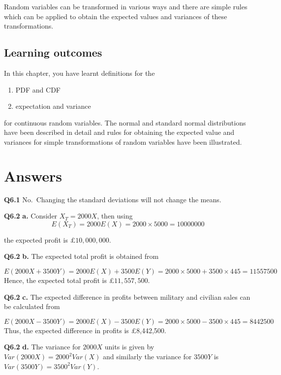 \documentclass[
  oneside]{krantz}
\begin{document}
Random variables can be transformed in various ways and there are simple rules which can be applied to obtain the expected values and variances of these transformations.

\hypertarget{learning-outcomes-3}{%
\subsection{Learning outcomes}\label{learning-outcomes-3}}

In this chapter, you have learnt definitions for the

\begin{enumerate}
\def\labelenumi{\arabic{enumi}.}
\item
  PDF and CDF
\item
  expectation and variance
\end{enumerate}

for continuous random variables. The normal and standard normal distributions have been described in detail and rules for obtaining the expected value and variances for simple transformations of random variables have been illustrated.

\hypertarget{ANScontrv}{%
\section{Answers}\label{ANScontrv}}

\textbf{Q6.1} No.~Changing the standard deviations will not change the means.

\textbf{Q6.2} \textbf{a.} Consider \(X_T = 2000X\), then using
\[E(X_T) = 2000E(X) = 2000 \times 5000 = 10000000\]

the expected profit is \(\pounds 10,000,000\).

\textbf{Q6.2} \textbf{b.} The expected total profit is obtained from

\[ E(2000X+3500Y) = 2000E(X) + 3500E(Y) = 2000 \times 5000 + 3500 \times 445 = 11557500 \]
Hence, the expected total profit is £\(11,557,500\).

\textbf{Q6.2} \textbf{c.} The expected difference in profits between military and civilian sales can be calculated from

\[E(2000X - 3500Y) = 2000E(X) - 3500E(Y) = 2000 \times 5000 - 3500 \times 445 = 8442500\]
Thus, the expected difference in profits is £8,442,500.

\textbf{Q6.2} \textbf{d.} The variance for \(2000X\) units is given by \(Var(2000X) = 2000^2Var(X)\) and similarly the variance for \(3500Y\) is \(Var(3500Y) = 3500^2Var(Y)\).
\end{document}
